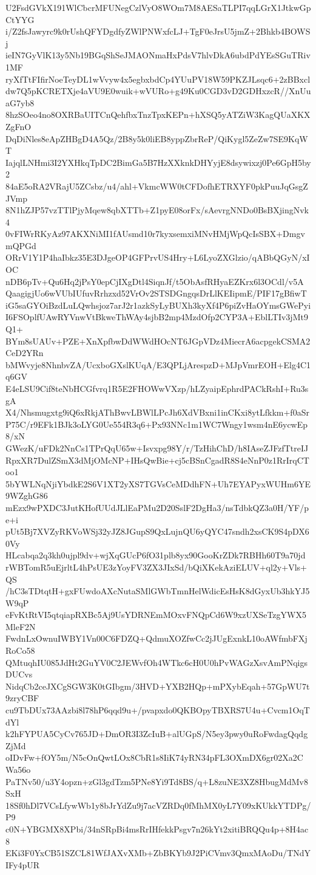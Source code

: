 U2FsdGVkX191WlCbcrMFUNegCzlVyO8WOm7M8AESaTLPI7qqLGrX1JtkwGpCtYYG
i/Z2fsJawyrc9k0rUshQFYDgdfyZWlPNWxfcLJ+TgF0eJrsU5jmZ+2Bhkb4BOWSj
ieIN7GyVlK13y5Nb19BGqShSeJMAONmaHxPdsV7hlvDkA6ubdPdYEsSGuTRiv1MF
ryXfTtFIfirNoeTeyDL1wVvyw4x5egbxbdCp4YUuPV18W59PKZJLsqc6+2zBBxcl
dw7Q5pKCRETXje4aVU9E0wuik+wVURo+g49Ku0CGD3vD2GDHxzcR//XnUuaG7yb8
8hzSOeo4no8OXRBaUITCnQehfbxTnzTpxKEPn+hXSQ5yATZiW3KagQUaXKXZgFnO
DqDiNles8eApZHBgD4A5Qz/2B8y5k0liEB8yppZbrReP/QiKygl5ZeZw7SE9KqWT
IajqlLNHmi3I2YXHkqTpDC2BimGa5B7HzXXknkDHYyjE8dsywixzj0Pe6GpH5by2
84aE5oRA2VRajU5ZCsbz/u4/ahl+VkmcWW0tCFDofhETRXYF0pkPuuJqGsgZJVmp
8N1hZJP57vzTTlPjyMqew8qbXTTb+Z1pyE08orFx/sAevrgNNDo0BsBXjingNvk4
0vFIWrRKyAz97AKXNiMI1fAUsmd10r7kyxsemxiMNvHMjWpQcIsSBX+DmgvmQPGd
ORrV1Y1P4haIbkz35E3DJgeOP4GFPrvUS4Hry+L6LyoZXGlzio/qABbQGyN/xIOC
nDB6pTv+Qu6Hq2jPsY0epCjIXgDtl4SiqnJf/t5ObAsfRHyaEZKrx6l3OCdl/v5A
QaagigjUo6wVUbIUfuvRrhzxd52VrOv2STSDGngqsDrLlKEIipmE/PIF17gBfiwT
iG5saGYOiBzdLuLQwhsjoz7arJ2r1azkSyLyBUXh3kyXf4P6piZvHaOYmsGWePyi
I6FSOplfUAwRYVnwVtBkweThWAy4sjbB2mp4MzdOfp2CYP3A+EblLTIv3jMt9Q1+
BYm8sUAUv+PZE+XnXpfbwDdWWdHOcNT6JGpVDz4MiecrA6acpgekCSMA2CeD2YRn
bMWvyje8NhnbvZA/UcxboGXslKUqA/E3QPLjArespzD+MJpVmrEOH+Elg4C1q6GV
E4eLSU9Cif8teNbHCGfvrq1R5E2FHOWwVXzp/hLZyaipEphrdPACkRshI+Ru3sgA
X4/Nhsmugxtg9iQ6xRkjAThBwvLBWlLPcJh6XdVBxni1inCKxi8ytLfkkm+f0aSr
P75C/r9EFk1BJk3oLYG0Ue554R3q6+Px93NNc1m1WC7Wngy1wsm4nE6ycwEp8/xN
GWezK/uFDk2NnCs1TPrQqU65w+Isvxpg98Y/r/TzHihChD/h8IAseZJFzfTtreIJ
RpxXR7DulZSmX3dMjOMcNP+IHsQwBie+cj5cBSnCgadR8S4eNnP0z1RrIrqCToo1
5bYWLNqNjiYbdkE2S6V1XT2yXS7TGVsCeMDdhFN+Uh7EYAPyxWUHm6YE9WZghG86
mEzx9wPXDC3JutKHofUUdJLlEaPMu2D20SslF2DgHa3/nsTdbkQZ3a0H/YF/pe+i
pUt5Bj7XVZyRKVoWSj32yJZ8JGupS9QxLujnQU6yQYC47sndh2xsCK9S4pDX60Vy
HLcabqa2q3kh0ujpl9dv+wjXqGUcP6fO31plb8yx90GooKrZDk7RBHh60T9a70jd
rWBTomR5uEjrltL4hPsUE3zYoyFV3ZX3JIxSd/bQiXKekAziELUV+ql2y+Vls+QS
/hC3sTDtqtH+gxFUwdoAXcNutaSMlGWbTmnHelWdicEsHsK8dGyxUb3hkYJ5W9qP
eFvKtRtVI5qtqiapRXBc5Aj9UsYDRNEmMOxvFNQpCd6W9xzUXSeTzgYWX5MleF2N
FwdnLxOwnuIWBY1Vn00C6FDZQ+QdmuXOZfwCc2jJUgExnkL10oAWfmbFXjRoCo58
QMtuqhIU085JdHt2GuYV0C2JEWvfOh4WTkc6cH0U0hPvWAGzXsvAmPNqigsDUCvs
NidqCb2ceJXCgSGW3K0tGIbgm/3HVD+YXB2HQp+mPXybEqah+57GpWU7t9zryCBF
cu9TbDUx73AAzbi8l78hP6qqd9u+/pvapxdo0QKBOpyTBXRS7U4u+Cvcm1OqTdYl
k2hFYPUA5CyCv765JD+DmOR3I3ZcIuB+alUGpS/N5ey3pwy0uRoFwdagQqdgZjMd
oIDvFw+fOY5m/N5cOnQwtLOx8CbR1s8IiK74yRN34pFL3OXmDX6gr02Xa2CWa56o
PaTNv50/u3Y4opzn+zGl3gdTzm5PNe8Yi9Td8BS/q+L8zuNE3XZ8HbugMdMv8SxH
18Sf0hDl7VCsLfywWb1y8bJrYdZu9j7acVZRDq0fMhMX0yL7Y09xKUkkYTDPg/P9
c0N+YBGMX8XPbi/34nSRpBi4msRrIHfekkPsgv7n26kYt2xitiBRQQu4p+8H4ac8
EKi3F0YxCB51SZCL81WfJAXvXMb+ZbBKYb9J2PiCVmv3QmxMAoDu/TNdYIFy4pUR

